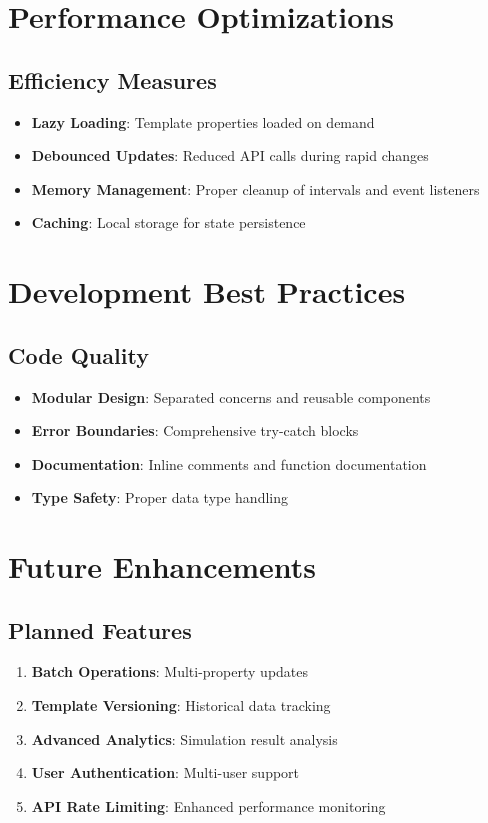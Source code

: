 \documentclass[12pt,a4paper]{article}
\begin{document}
\section{Performance Optimizations}

\subsection{Efficiency Measures}
\begin{itemize}
    \item \textbf{Lazy Loading}: Template properties loaded on demand
    \item \textbf{Debounced Updates}: Reduced API calls during rapid changes
    \item \textbf{Memory Management}: Proper cleanup of intervals and event listeners
    \item \textbf{Caching}: Local storage for state persistence
\end{itemize}

\section{Development Best Practices}

\subsection{Code Quality}
\begin{itemize}
    \item \textbf{Modular Design}: Separated concerns and reusable components
    \item \textbf{Error Boundaries}: Comprehensive try-catch blocks
    \item \textbf{Documentation}: Inline comments and function documentation
    \item \textbf{Type Safety}: Proper data type handling
\end{itemize}

\section{Future Enhancements}

\subsection{Planned Features}
\begin{enumerate}
    \item \textbf{Batch Operations}: Multi-property updates
    \item \textbf{Template Versioning}: Historical data tracking
    \item \textbf{Advanced Analytics}: Simulation result analysis
    \item \textbf{User Authentication}: Multi-user support
    \item \textbf{API Rate Limiting}: Enhanced performance monitoring
\end{enumerate}
\end{document}
